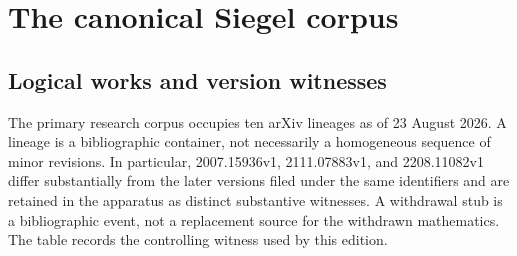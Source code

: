 \section{The canonical Siegel corpus}
\label{sec:corpus}

\subsection{Logical works and version witnesses}

The primary research corpus occupies ten arXiv lineages as of 23 August
2026.  A lineage is a bibliographic container, not necessarily a homogeneous
sequence of minor revisions.  In particular, 2007.15936v1,
2111.07883v1, and 2208.11082v1 differ substantially from the later versions
filed under the same identifiers and are retained in the apparatus as
distinct substantive witnesses.  A withdrawal stub is a bibliographic
event, not a replacement source for the withdrawn mathematics.  The table
records the controlling witness used by this edition.

